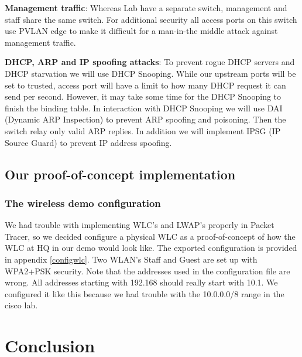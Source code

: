 \textbf{Management traffic}: Whereas Lab have a separate switch, management and staff share the same switch. For additional security all access ports on this switch use PVLAN edge to make it difficult for a man-in-the middle attack against management traffic.

\textbf{DHCP, ARP and IP spoofing attacks}: To prevent rogue DHCP servers and DHCP starvation we will use DHCP Snooping. While our upstream ports will be set to trusted, access port will have a limit to how many DHCP request it can send per second. However, it may take some time for the DHCP Snooping to finish the binding table. In interaction with DHCP Snooping we will use DAI (Dynamic ARP Inspection) to prevent ARP spoofing and poisoning. Then the switch relay only valid ARP replies. In addition we will implement IPSG (IP Source Guard) to prevent IP address spoofing.


\subsection{Our proof-of-concept implementation}



\subsubsection{The wireless demo configuration}

We had trouble with implementing WLC's and LWAP's properly in Packet Tracer, so we decided configure a physical WLC as a proof-of-concept of how the WLC at HQ in our demo would look like. The exported configuration is provided in appendix \ref{configwlc}. Two WLAN's Staff and Guest are set up with WPA2+PSK security. Note that the addresses used in the configuration file are wrong. All addresses starting with 192.168 should really start with 10.1. We configured it like this because we had trouble with the 10.0.0.0/8 range in the cisco lab.

\section{Conclusion}

